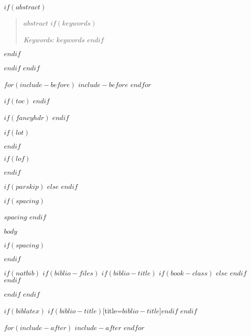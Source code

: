\documentclass[$if(fontsize)$$fontsize$,$endif$$if(lang)$$lang$,$endif$$if(papersize)$$papersize$,$endif$$for(classoption)$$classoption$$sep$,$endfor$]{$documentclass$}
\begin{document}
$if(abstract)$
\begin{abstract}
\noindent $abstract$
$if(keywords)$

\emph{Keywords:} $keywords$
$endif$
\end{abstract}
$endif$

$endif$
$endif$

$for(include-before)$
$include-before$
$endfor$

$if(toc)$
\tableofcontents
\clearpage
$endif$

$if(fancyhdr)$
\pagestyle{mainstyle}
$endif$

$if(lot)$
\listoftables
\clearpage
$endif$

$if(lof)$
\listoffigures
\clearpage
$endif$

$if(parskip)$
\setlength{\parskip}{$parskip$}
$else$
\setlength{\parskip}{11pt}
$endif$

$if(spacing)$
\begin{spacing}{$spacing$}
$endif$

$body$

$if(spacing)$
\end{spacing}
$endif$

$if(natbib)$
$if(biblio-files)$
$if(biblio-title)$
$if(book-class)$
\renewcommand\bibname{$biblio-title$}
$else$
\renewcommand\refname{$biblio-title$}
$endif$
$endif$

$endif$
$endif$

$if(biblatex)$
\printbibliography$if(biblio-title)$[title=$biblio-title$]$endif$
$endif$

$for(include-after)$
$include-after$
$endfor$
\end{document}
